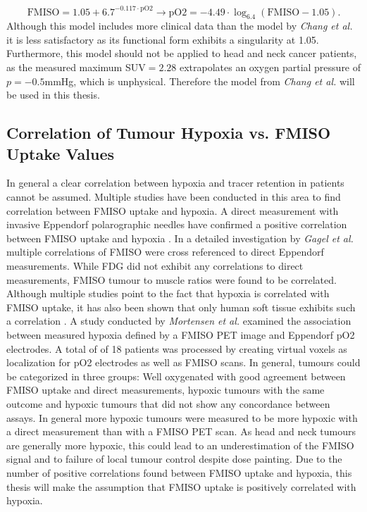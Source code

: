 \begin{equation}
\mathrm{FMISO} = 1.05 + 6.7^{-0.117\cdot \mathrm{pO2}}\rightarrow \mathrm{pO2} = -4.49\cdot \log_{6.4}(\mathrm{FMISO - 1.05}).
\end{equation}
Although this model includes more clinical data than the model by \textit{Chang et al.} \cite{pmid19994538} it is less satisfactory as its functional form exhibits a singularity at 1.05. Furthermore, this model should not be applied to head and neck cancer patients, as the measured maximum SUV$= 2.28$ extrapolates an oxygen partial pressure of $p=-0.5$mmHg, which is unphysical. Therefore the model from \textit{Chang et al.}\cite{pmid19994538} will be used in this thesis.
\subsection{Correlation of Tumour Hypoxia vs. FMISO Uptake Values}\label{chap:hypoxiacorrelation}
In general a clear correlation between hypoxia and tracer retention in patients cannot be assumed. Multiple studies have been conducted in this area to find correlation between FMISO uptake and hypoxia. A direct measurement with invasive Eppendorf polarographic needles have confirmed a positive correlation between FMISO uptake and hypoxia \cite{pmid16104907, pmid16841141, pmid17598907, pmid15480509, pmid8892467}. In a detailed investigation by \textit{Gagel et al.} \cite{pmid17598907} multiple correlations of FMISO were cross referenced to direct Eppendorf measurements. While FDG did not exhibit any correlations to direct measurements, FMISO tumour to muscle ratios were found to be correlated. Although multiple studies point to the fact that hypoxia is correlated with FMISO uptake, it has also been shown that only human soft tissue exhibits such a correlation \cite{pmid12865184}. A study conducted by \textit{Mortensen et al.} \cite{pmid20831480} examined the association between measured hypoxia defined by a FMISO PET image and Eppendorf pO2 electrodes.  A total of of 18 patients was processed by creating virtual voxels as localization for pO2 electrodes as well as FMISO scans. In general, tumours could be categorized in three groups: Well oxygenated with good agreement between FMISO uptake and direct measurements, hypoxic tumours with the same outcome and hypoxic tumours that did not show any concordance between assays. In general more hypoxic tumours were measured to be more hypoxic with a direct measurement than with a FMISO PET scan. As head and neck tumours are generally more hypoxic, this could lead to an underestimation of the FMISO signal and to failure of local tumour control  despite dose painting. Due to the number of positive correlations found between FMISO uptake and hypoxia, this thesis will make the assumption that FMISO uptake is positively correlated with hypoxia.
